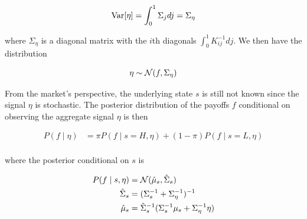 \documentclass{article}
\begin{document}
$$
\text{Var}[\eta] = \int_0^1 \Sigma_j dj = \Sigma_\eta
$$

\noindent where $\Sigma_\eta$ is a diagonal matrix with the $i$th diagonals $\int_0^1 K^{-1}_{ij} dj$. We then have the distribution

$$
\eta \sim \mathcal{N}(f, \Sigma_\eta)
$$

From the market's perspective, the underlying state $s$ is still not known since the signal $\eta$ is stochastic. The posterior distribution of the payoffs $f$ conditional on observing the aggregate signal $\eta$ is then

\begin{align*}
    P(f \mid \eta) &= \pi P(f \mid s=H, \eta) + (1-\pi) P(f \mid s=L, \eta) \\
\end{align*}

\noindent where the posterior conditional on $s$ is

\begin{align*}
    P(f \mid s, \eta) &= \mathcal{N}(\hat \mu_s, \hat \Sigma_s) \\
    \hat \Sigma_s &= (\Sigma_s^{-1} + \Sigma_\eta^{-1})^{-1} \\
    \hat \mu_s &= \hat \Sigma_s^{-1} (\Sigma_s^{-1} \mu_s + \Sigma_\eta^{-1} \eta)
\end{align*}


\end{document}
